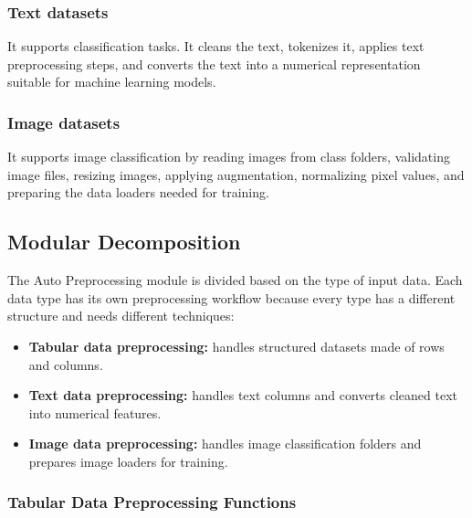 \documentclass[12pt,a4paper]{report}
\begin{document}
\subsubsection{Text datasets}
\noindent It supports classification tasks. It cleans the text,
tokenizes it, applies text preprocessing steps, and converts the text into a
numerical representation suitable for machine learning models.
\subsubsection{Image datasets}
\noindent It supports image classification by reading images from class
folders, validating image files, resizing images, applying augmentation, normalizing pixel values, and
preparing the data loaders needed for training.




\subsection{Modular Decomposition}
\noindent The Auto Preprocessing module is divided based on the type of input
data. Each data type has its own preprocessing workflow because every type has a
different structure and needs different techniques:

\begin{itemize}
    \item \textbf{Tabular data preprocessing:} handles structured datasets made
    of rows and columns.
    \item \textbf{Text data preprocessing:} handles text columns and converts
    cleaned text into numerical features.
    \item \textbf{Image data preprocessing:} handles image classification
    folders and prepares image loaders for training.
\end{itemize}

\subsubsection{Tabular Data Preprocessing Functions}
\end{document}
